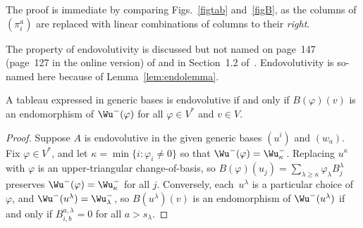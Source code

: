 The proof is immediate by comparing Figs.~\ref{figtab} and~\ref{figB}, as
the columns of $(\pi^a_i)$ are replaced with linear combinations of columns to
their \emph{right}.

The property of endovolutivity is discussed but not named on page~147 (page~127 in
the online version) of \cite{BCGGG} and in Section~1.2 of~\cite{Yang1987}.
Endovolutivity is so-named here because of Lemma~\ref{lem:endolemma}.

\begin{Lemma}\label{lem:endolemma}
A tableau expressed in generic bases is endovolutive if and only if
$B(\varphi)(v)$ is an endomorphism of $\Wu^-(\varphi)$ for all
$\varphi \in V^*$ and $v \in V$.
\end{Lemma}

\begin{proof}
Suppose $A$ is endovolutive in the given generic bases $(u^i)$ and $(w_a)$.
Fix $\varphi \in V^*$, and let $\kappa = \min
\{ i\colon \varphi_i \neq 0\}$ so that $\Wu^-(\varphi) = \Wu^-_\kappa$.
Replacing $u^\kappa$ with $\varphi$ is an upper-triangular
change-of-basis, so $B(\varphi)(u_j) = \sum\limits_{\lambda \geq \kappa} \varphi_\lambda B^\lambda_j$
preserves $\Wu^-(\varphi)=\Wu^-_{\kappa}$ for all $j$.
Conversely, each~$u^\lambda$ is a particular
choice of $\varphi$, and $\Wu^-(u^\lambda) = \Wu^-_\lambda$, so
$B(u^\lambda)(v)$ is an endomorphism of $\Wu^-(u^\lambda)$ if and only if
$B^{a,\lambda}_{i,b}=0$ for all $a > s_\lambda$.
\end{proof}

